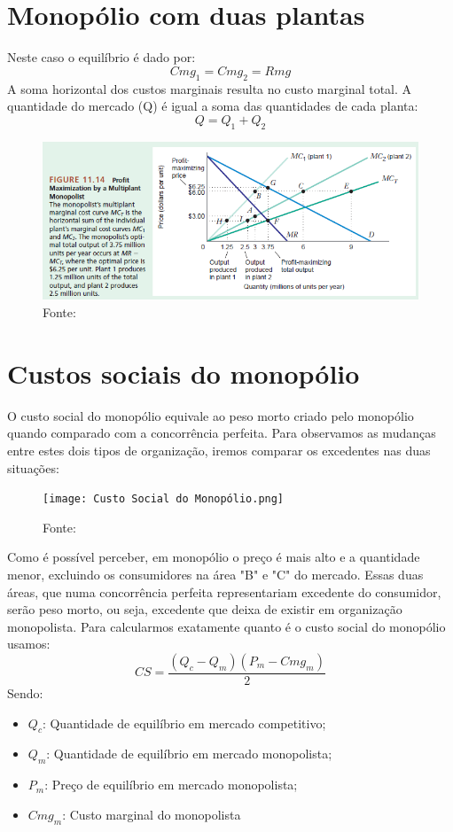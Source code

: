 \documentclass[12pt,a4paper,oneside,brazil]{abntex2}
\begin{document}
\section{Monopólio com duas plantas}
Neste caso o equilíbrio é dado por:
\[ Cmg_1 = Cmg_2 = Rmg\]
A soma horizontal dos custos marginais resulta no custo marginal total. A quantidade do mercado (Q) é igual a soma das quantidades de cada planta:
\[ Q = Q_1 + Q_2 \]
\begin{figure}[ht]
\includegraphics[scale=0.7]{Duas plantas.png}
\centering
\caption{Fonte: \cite{besanko}}
\end{figure}

\section{Custos sociais do monopólio}
O custo social do monopólio equivale ao peso morto criado pelo monopólio quando comparado com a concorrência perfeita. Para observamos as mudanças entre estes dois tipos de organização, iremos comparar os excedentes nas duas situações:

\begin{figure}
	\texttt{[image: Custo Social do Monopólio.png]}
	\centering
	\caption{Fonte: \cite[p. 371]{pindyck}}
\end{figure}
Como é possível perceber, em monopólio o preço é mais alto e a quantidade menor, excluindo os consumidores na área "B" e "C" do mercado. Essas duas áreas, que numa concorrência perfeita representariam excedente do consumidor, serão peso morto, ou seja, excedente que deixa de existir em organização monopolista. 
\clearpage
Para calcularmos exatamente quanto é o custo social do monopólio usamos:
\[ CS = \frac{(Q_c - Q_m) (P_m - Cmg_m)}{2} \]
Sendo:
\begin{itemize}
\item $Q_c$: Quantidade de equilíbrio em mercado competitivo;
\item $Q_m$: Quantidade de equilíbrio em mercado monopolista;
\item $P_m$: Preço de equilíbrio em mercado monopolista;
\item $Cmg_m$: Custo marginal do monopolista
\end{itemize}
\end{document}
